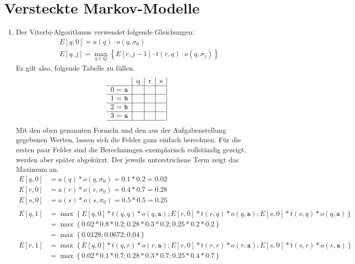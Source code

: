 \documentclass[a4paper,10pt]{article}
\begin{document}
\section{Versteckte Markov-Modelle}
\begin{enumerate}
	\item Der Viterbi-Algorithmus verwendet folgende Gleichungen: \begin{align*}
		&E[q,0] = a(q) \cdot o(q, \sigma_0)\\
		&E[q,j] = \max\limits_{q\in Q} \left\{E[r,j-1]\cdot t(r,q)\cdot o(q,\sigma_j)\right\}
		\end{align*}
		Es gilt also, folgende Tabelle zu füllen. \begin{align*}
		\begin{tabular}{ c | l | l | l | }
			 & q & r & s \\
			\hline
			0 = \texttt{a} &  &  &\\
			\hline
			1 = \texttt{b} &  &  &\\
			\hline
			2 = \texttt{b} &  &  &\\
			\hline
			3 = \texttt{a} &  &  &\\
			\hline
		\end{tabular} \end{align*}
		Mit den oben genannten Formeln und den aus der Aufgabenstellung gegebenen Werten, lassen sich die Felder ganz einfach berechnen. Für die ersten paar Felder sind die Berechnungen exemplarisch vollständig gezeigt, werden aber später abgekürzt. Der jeweils unterstrichene Term zeigt das Maximum an. \begin{align*}
			E[q, 0] &= a(q) * o(q, \sigma_0) = 0.1 * 0.2 = 0.02\\
			E[r, 0] &= a(r) * o(r, \sigma_0) = 0.4 * 0.7 = 0.28\\
			E[s, 0] &= a(s) * o(s, \sigma_0) = 0.5 * 0.5 = 0.25\\
			\\
			E[q, 1] &= \max\left\{E[q, 0] * t(q, q) * o(q, \texttt{a}); E[r, 0] * t(r, q) * o(q, \texttt{a}); E[s, 0] * t(s, q) * o(q, \texttt{a})\right\}\\
			&= \max\left\{0.02 * 0.8 * 0.2; 0.28 * 0.3 * 0.2; 0.25 * 0.2 * 0.2\right\}\\
			&= \max\left\{0.0128; \underline{0.0672}; 0.04\right\}\\
			E[r, 1] &= \max\left\{E[q, 0] * t(q, r) * o(r, \texttt{a}); E[r, 0] * t(r, r) * o(r, \texttt{a}); E[s, 0] * t(s, r) * o(r, \texttt{a})\right\}\\
			&= \max\left\{0.02 * 0.1 * 0.7; 0.28 * 0.3 * 0.7; 0.25 * 0.4 * 0.7\right\}\\

\end{align*}
\end{enumerate}
\end{document}
